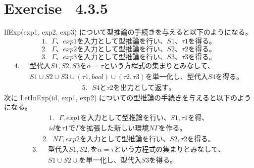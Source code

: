 \documentclass{jreport}
\begin{document}
\section{Exercise \ 4.3.5}
IfExp(exp1, exp2, exp3) について型推論の手続きを与えると以下のようになる。
  \begin{equation}
      1. \ \ \  \Gamma、exp1 を入力として型推論を行い、S1、 \tau1 を得る。
\end{equation}
\begin{equation}
  2. \ \ \  \Gamma、exp2 を入力として型推論を行い、S2、 \tau2 を得る。
\end{equation}
\begin{equation}
  3. \ \ \  \Gamma、exp3 を入力として型推論を行い、S3、 \tau3 を得る。
\end{equation}
\begin{equation}
  \begin{split}
   4. \ \ \ & 型代入S1, S2, S3 を \alpha = \tau という方程式の集まりとみなして、
   \\ &S1 \cup S2 \cup S3 \cup (\tau1, bool) \cup (\tau2, \tau3) を単一化し、型代入S4を得る。
  \end{split}
\end{equation}
\begin{equation}
  \begin{split}
    5. \ \ \  S4 と \tau2 を出力として返す。 
  \end{split}
\end{equation}
次に LetInExp(id, exp1, exp2) についての型推論の手続きを与えると以下のようになる。
\begin{equation}
  \begin{split}
    1. \ \ \ \Gamma, exp1 を入力として型推論を行い、S1,  \tau1 を得、 \\ id を \tau1 で \Gamma を
    拡張した新しい環境 N\Gamma を作る。
  \end{split}
\end{equation}
\begin{equation}
  \begin{split}
    2. \ \ \ N\Gamma, exp2 を入力として型推論を行い、S2,  \tau2 を得る。
  \end{split}
\end{equation}
\begin{equation}
  \begin{split}
    3. \ \ \ &型代入S1, S2, を \alpha = \tau という方程式の集まりとみなして、 \\
    &S1 \cup S2 \cup を単一化し、型代入 S3 を得る。
  \end{split}
\end{equation}
\end{document}
